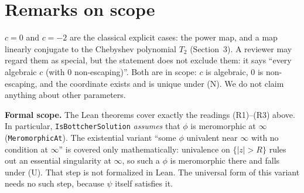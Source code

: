 \documentclass[11pt]{article}
\theoremstyle{definition}
\theoremstyle{remark}
\renewcommand{\_}{\oldus\allowbreak}
\begin{document}
\section{Remarks on scope}

$c=0$ and $c=-2$ are the classical explicit cases: the power map, and a map linearly conjugate to the
Chebyshev polynomial $T_2$ (Section~3). A reviewer may regard them as special, but the statement does
not exclude them: it says ``every algebraic $c$ (with $0$ non-escaping)''. Both are in scope: $c$ is
algebraic, $0$ is non-escaping, and the coordinate exists and is unique under (N). We do not claim
anything about other parameters.

\textbf{Formal scope.} The Lean theorems cover exactly the readings (R1)--(R3) above. In particular,
\texttt{IsBottcherSolution} \emph{assumes} that $\phi$ is meromorphic at $\infty$
(\texttt{MeromorphicAt}). The existential variant ``some $\phi$ univalent near $\infty$ with no
condition at $\infty$'' is covered only mathematically: univalence on $\{|z|>R\}$ rules out an
essential singularity at $\infty$, so such a $\phi$ is meromorphic there and falls under (U). That step
is not formalized in Lean. The universal form of this variant needs no such step, because $\psi$ itself
satisfies it.
\end{document}
